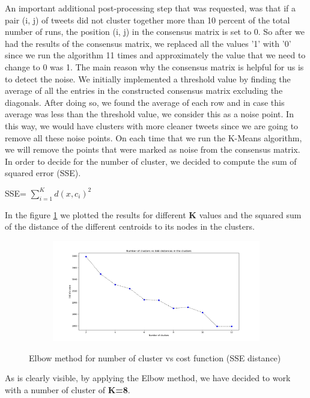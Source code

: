 \documentclass{article}
\begin{document}
An important additional post-processing step that was requested, was that if a pair (i, j) of tweets did not cluster together more than 10 percent of the total number of runs, the position (i, j) in the consensus matrix is set to 0. So after we had the results of the consensus matrix, we replaced all the values '1' with '0' since we run the algorithm 11 times and approximately the value that we need to change to 0 was 1. 
The main reason why the consensus matrix is helpful for us is to detect the noise. We initially implemented a threshold value by finding the average of all the entries in the constructed consensus matrix excluding the diagonals. After doing so, we found the average of each row and in case this average was less than the threshold value, we consider this as a noise point. In this way, we would have clusters with more cleaner tweets since we are going to remove all these noise points. On each time that we run the K-Means algorithm, we will remove the points that were marked as noise from the consensus matrix. 
In order to decide for the number of cluster, we decided to compute the sum of squared error (SSE). 

SSE= $\sum\limits_{i=1}^K d(x,c_{i})^2 $

In the figure \ref{fig:elbow} we plotted the results for different \textbf{K} values and the squared sum of the distance of the different centroids to its nodes in the clusters.

\begin{figure}[H]
    \begin{subfigure} {1\textwidth}  
        \centering 
        \includegraphics[width=1\linewidth]{./img/kmeans_elbow.png}
    \end{subfigure}    
    \caption{Elbow method for number of cluster vs cost function (SSE distance)}
    \label{fig:elbow}
\end{figure}

As is clearly visible, by applying the Elbow method, we have decided to work with a number of cluster of \textbf{K=8}.
\end{document}

